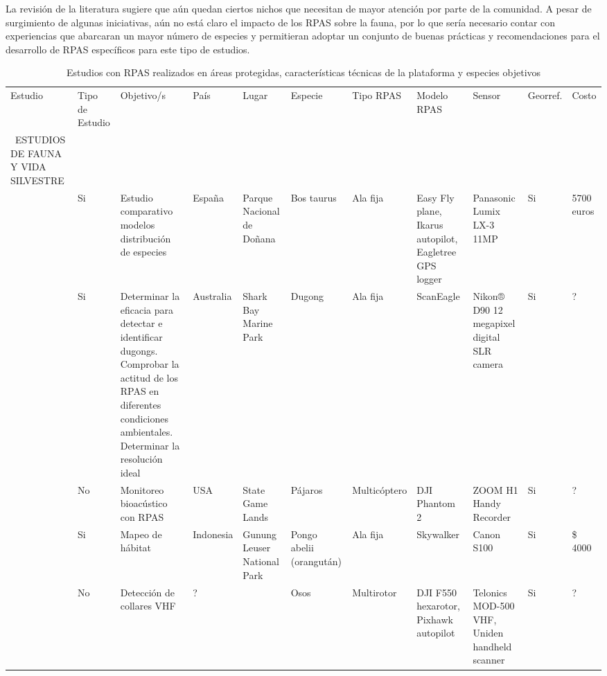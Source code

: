 \documentclass[twocolumn]{extarticle}
\begin{document}
La revisión de la literatura sugiere que aún quedan ciertos nichos que
necesitan de mayor atención por parte de la comunidad. A pesar de
surgimiento de algunas iniciativas, aún no está claro el impacto de los
RPAS sobre la fauna, por lo que sería necesario contar con experiencias
que abarcaran un mayor número de especies y permitieran adoptar un
conjunto de buenas prácticas y recomendaciones para el desarrollo de
RPAS específicos para este tipo de estudios.

\onecolumn

\begin{sidewaystable}
\centering
\captionsetup{font=scriptsize,labelfont=scriptsize}
\caption{Estudios con RPAS realizados en áreas protegidas, características técnicas de la plataforma y especies objetivos}
\label{my-label}
\tiny
\begin{tabular}{p{2.5cm}p{1cm}p{3cm}p{1cm}p{2cm}p{2cm}p{1cm}p{2cm}p{2cm}p{1cm}p{0.5cm}}
\cmidrule(r){1-11}

Estudio & Tipo de Estudio & Objetivo/s & País & Lugar & Especie & Tipo RPAS & Modelo RPAS & Sensor & Georref. & Costo \\ \cmidrule(r){1-11}

\ ESTUDIOS DE FAUNA Y VIDA SILVESTRE \\ 


\cite{PazmanyMulero2015}  & Si & Estudio comparativo modelos distribución de especies & España & Parque Nacional de Doñana & Bos taurus  & Ala fija & Easy Fly plane, Ikarus autopilot, Eagletree GPS logger & Panasonic Lumix LX-3 11MP & Si & 
5700 euros \\ 

\citealt{Hodgson2013} & Si & Determinar la eficacia para detectar e identificar dugongs.  Comprobar la actitud de los RPAS en diferentes condiciones ambientales. Determinar la resolución ideal  & Australia & Shark Bay Marine Park & Dugong & Ala fija &  ScanEagle & Nikon® D90 12 megapixel digital SLR camera  & Si & ?  \\ 


\cite{Wilson2017}  & No & Monitoreo bioacústico con RPAS & USA & State Game Lands & Pájaros  & Multicóptero & DJI Phantom 2 & ZOOM H1 Handy Recorder  & Si & ? \\ 

\cite{Szantoi2017}  & Si & Mapeo de hábitat & Indonesia & Gunung Leuser National Park & Pongo abelii (orangután)  & Ala fija & Skywalker & Canon S100  & Si & \$ 4000 \\ 


\cite{Bayram2016}  &  No & Detección de collares VHF & ? & & Osos  & Multirotor & DJI F550 hexarotor, Pixhawk autopilot & Telonics MOD-500 VHF, Uniden handheld scanner  & Si & ? \\ 


\end{tabular}
\end{sidewaystable}
\end{document}
